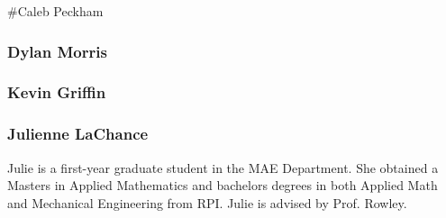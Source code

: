 \#\+Caleb Peckham

\subsubsection*{Dylan Morris}

\subsubsection*{Kevin Griffin}

\subsubsection*{Julienne La\+Chance}

Julie is a first-\/year graduate student in the M\+AE Department. She obtained a Master\textquotesingle{}s in Applied Mathematics and bachelors degrees in both Applied Math and Mechanical Engineering from R\+PI. Julie is advised by Prof. Rowley. 